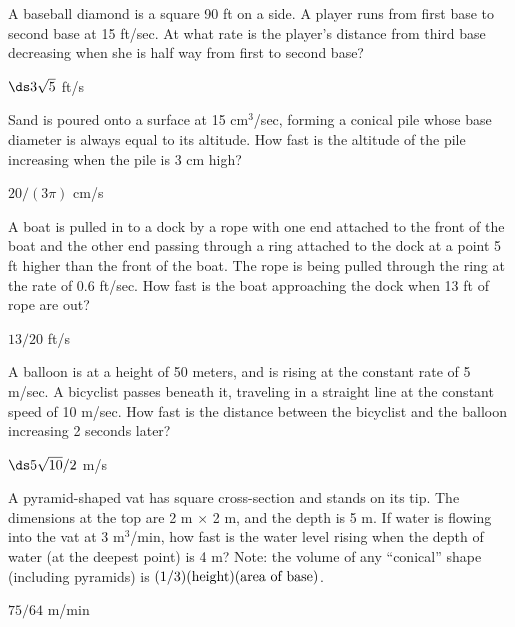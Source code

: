 \begin{exercises}
\begin{exercise}
A baseball diamond is a square 90 ft on a side.  A player runs from first
base to second base at 15 ft/sec.  At what rate is the player's distance
from third base decreasing when she is half way from first to second base?
\begin{answer} $\ds 3\sqrt5$ ft/s
\end{answer}\end{exercise}

\begin{exercise} Sand is poured onto a surface at 15 cm${}^3$/sec, forming a
conical pile whose base diameter is always equal to its altitude.  How
fast is the altitude of the pile increasing when the pile is 3 cm
high?
\begin{answer} $20/(3\pi)$ cm/s
\end{answer}\end{exercise}

\begin{exercise}
A boat is pulled in to a dock by a rope with one end attached to the front
of the boat and the other end passing through a ring attached to the dock
at a point 5 ft higher than the front of the boat.  The rope is being
pulled through the ring at the rate of 0.6 ft/sec.  How fast is the boat
approaching the dock when 13 ft of rope are out?
\begin{answer} $13/20$ ft/s
\end{answer}\end{exercise}

\begin{exercise}
A balloon is at a height of 50 meters, and is rising at the constant rate
of 5 m/sec.  A bicyclist passes beneath it, traveling in a
straight line at the constant speed of 10 m/sec.  How fast is the distance
between the bicyclist and the balloon increasing 2 seconds later?
\begin{answer} $\ds 5\sqrt{10}/2$ m/s
\end{answer}\end{exercise}

\begin{exercise} A pyramid-shaped vat has square cross-section and stands on its
tip.  The dimensions at the top are 2 m $\times$ 2 m, and the depth is
5 m.  If water is flowing into the vat at 3 m${}^3$/min, how fast is
the water level rising when the depth of water (at the deepest point)
is 4 m?  Note: the volume of any ``conical'' shape (including
pyramids) is $(1/3)(\hbox{height})(\hbox{area of base})$.
\begin{answer} $75/64$ m/min
\end{answer}\end{exercise}


\end{exercises}
